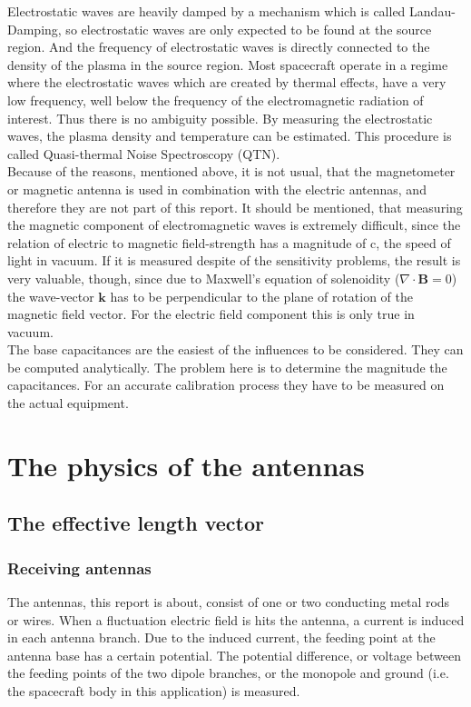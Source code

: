 \documentclass[a4paper,11pt]{report}
\begin{document}
Electrostatic waves are heavily damped by a mechanism which is called Landau-Damping, so electrostatic waves are only expected to be found at the source region. And the frequency of electrostatic waves is directly connected to the density of the plasma in the source region. Most spacecraft operate in a regime where the electrostatic waves which are created by thermal effects, have a very low frequency, well below the frequency of the electromagnetic radiation of interest. Thus there is no ambiguity possible. By measuring the electrostatic waves, the plasma density and temperature can be estimated. This procedure is called Quasi-thermal Noise Spectroscopy (QTN).\\

Because of the reasons, mentioned above, it is not usual, that the magnetometer or magnetic antenna is used in combination with the electric antennas, and therefore they are not part of this report. It should be mentioned, that measuring the magnetic component of electromagnetic waves is extremely difficult, since the relation of electric to magnetic field-strength has a magnitude of c, the speed of light in vacuum. If it is measured despite of the sensitivity problems, the result is very valuable, though, since due to Maxwell's equation of solenoidity ($\nabla \cdot \mathbf{B}=0$) the wave-vector $\mathbf{k}$ has to be perpendicular to the plane of rotation of the magnetic field vector. For the electric field component this is only true in vacuum.\\

The base capacitances are the easiest of the influences to be considered. They can be computed analytically. The problem here is to determine the magnitude the capacitances. For an accurate calibration process they have to be measured on the actual equipment.

\chapter{The physics of the antennas}
\section{The effective length vector}
\subsection{Receiving antennas}

The antennas, this report is about, consist of one or two conducting metal rods or wires. When a fluctuation electric field is hits the antenna, a current is induced in each antenna branch. Due to the induced current, the feeding point at the antenna base has a certain potential. The potential difference, or voltage between the feeding points of the two dipole branches, or the monopole and ground (i.e. the spacecraft body in this application) is measured. \\
\end{document}
